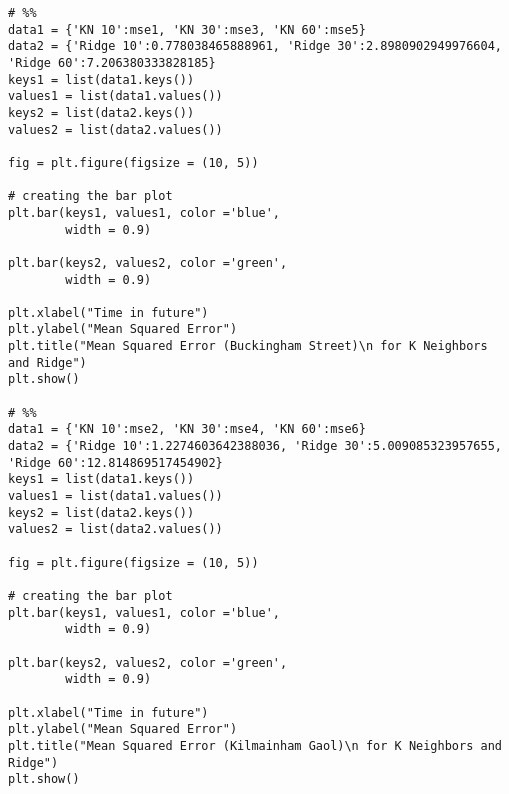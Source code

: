 \begin{verbatim}
# %%
data1 = {'KN 10':mse1, 'KN 30':mse3, 'KN 60':mse5}
data2 = {'Ridge 10':0.778038465888961, 'Ridge 30':2.8980902949976604, 'Ridge 60':7.206380333828185}
keys1 = list(data1.keys())
values1 = list(data1.values())
keys2 = list(data2.keys())
values2 = list(data2.values())
  
fig = plt.figure(figsize = (10, 5))
 
# creating the bar plot
plt.bar(keys1, values1, color ='blue',
        width = 0.9)

plt.bar(keys2, values2, color ='green',
        width = 0.9)

plt.xlabel("Time in future")
plt.ylabel("Mean Squared Error")
plt.title("Mean Squared Error (Buckingham Street)\n for K Neighbors and Ridge")
plt.show()

# %%
data1 = {'KN 10':mse2, 'KN 30':mse4, 'KN 60':mse6}
data2 = {'Ridge 10':1.2274603642388036, 'Ridge 30':5.009085323957655, 'Ridge 60':12.814869517454902}
keys1 = list(data1.keys())
values1 = list(data1.values())
keys2 = list(data2.keys())
values2 = list(data2.values())
  
fig = plt.figure(figsize = (10, 5))
 
# creating the bar plot
plt.bar(keys1, values1, color ='blue',
        width = 0.9)

plt.bar(keys2, values2, color ='green',
        width = 0.9)

plt.xlabel("Time in future")
plt.ylabel("Mean Squared Error")
plt.title("Mean Squared Error (Kilmainham Gaol)\n for K Neighbors and Ridge")
plt.show()

\end{verbatim}

